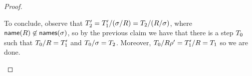\begin{proof}
\begin{enumerate}
  To conclude, observe that $T'_2 = T'_1/(\sigma/R) = T_2/(R/\sigma)$,
  where $\mathsf{name}(R) \not\in \mathsf{names}(\sigma)$,
  so by the previous claim we have that
  there is a step $T_0$ such that
  $T_0/R = T'_1$ and
  $T_0/\sigma = T_2$.
  Moreover, $T_0/R\rho' = T'_1/R = T_1$ 
  so we are done.
\end{enumerate}
\end{proof}
